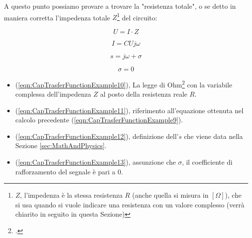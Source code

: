 \documentclass[a4paper, 10pt, final]{article} %
\begin{document}
    \noindent A questo punto possiamo provare a trovare la "resistenza totale", o se detto in maniera corretta l'impedenza totale $Z$\footnote{$Z$, l'impedenza \`{e} la stessa resistenza $R$ (anche quella si misura in $[\Omega]$), che si usa quando si vuole indicare una resistenza con un valore complesso (verr\`{a} chiarito in seguito in questa Sezione)} del circuito:
    \begin{figure}[H]
        \centering
        \begin{minipage}[b]{.21\linewidth}
            \centering
            \begin{equation} \label{eqn:CapTrasferFunctionExample10}
                U = I \cdot Z
            \end{equation}
        \end{minipage}
        \hspace{0.04\linewidth}
        \begin{minipage}[b]{.21\linewidth}
            \centering
            \begin{equation} \label{eqn:CapTrasferFunctionExample11}
                I = C U j \omega
            \end{equation}
        \end{minipage}
        \hspace{0.04\linewidth}
        \begin{minipage}[b]{.21\linewidth}
            \centering
            \begin{equation} \label{eqn:CapTrasferFunctionExample12}
                s = j\omega + \sigma
            \end{equation}
        \end{minipage}
        \hspace{0.04\linewidth}
        \begin{minipage}[b]{.21\linewidth}
            \centering
            \begin{equation} \label{eqn:CapTrasferFunctionExample13}
                \sigma = 0
            \end{equation}
        \end{minipage}
    \end{figure}
    \begin{itemize}
        \item (\ref{eqn:CapTrasferFunctionExample10}), La legge di Ohm\footcite[]{Ohm:Wiki} con la variabile complessa dell'impedenza $Z$ al posto della resistenza reale $R$.
        \item (\ref{eqn:CapTrasferFunctionExample11}), riferimento all'equazione ottenuta nel calcolo precedente (\ref{eqn:CapTrasferFunctionExample9}).
        \item (\ref{eqn:CapTrasferFunctionExample12}), definizione dell'$s$ che viene data nella Sezione \ref{sec:MathAndPhysics}.
        \item (\ref{eqn:CapTrasferFunctionExample13}), assunzione che $\sigma$, il coefficiente di rafforzamento del segnale \`{e} pari a $0$.
    \end{itemize}
\end{document}
